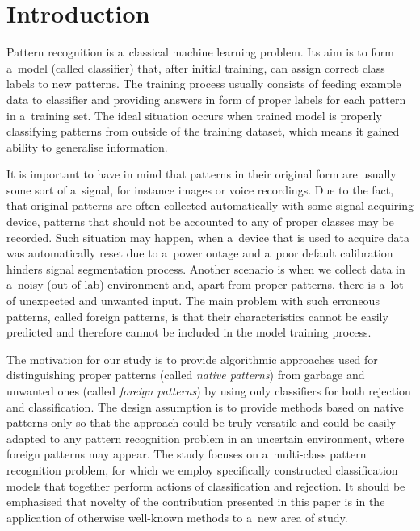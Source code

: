 \documentclass{llncs}
\begin{document}

\section{Introduction}
  \label{sec:Introduction}

Pattern recognition is a~classical machine learning problem. Its aim is to form a~model (called classifier) that, after initial training, can assign correct class labels to new patterns. The training process usually consists of feeding example data to classifier and providing answers in form of proper labels for each pattern in a~training set. The ideal situation occurs when trained model is properly classifying patterns from outside of the training dataset, which means it gained ability to generalise information. 

It is important to have in mind that patterns in their original form are usually some sort of a~signal, for instance images or voice recordings. Due to the fact, that original patterns are often collected automatically with some signal-acquiring device, patterns that should not be accounted to any of proper classes may be recorded. Such situation may happen, when a~device that is used to acquire data was automatically reset due to a~power outage and a~poor default calibration hinders signal segmentation process. Another scenario is when we collect data in a~noisy (out of lab) environment and, apart from proper patterns, there is a~lot of unexpected and unwanted input. The main problem with such erroneous patterns, called foreign patterns, is that their characteristics cannot be easily predicted and therefore cannot be included in the model training process.

The motivation for our study is to provide algorithmic approaches used for distinguishing proper patterns (called \emph{native patterns}) from garbage and unwanted ones (called \emph{foreign patterns}) by using only classifiers for both rejection and classification. The design assumption is to provide methods based on native patterns only so that the approach could be truly versatile and could be easily adapted to any pattern recognition problem in an uncertain environment, where foreign patterns may appear. The study focuses on a~multi-class pattern recognition problem, for which we employ specifically constructed classification models that together perform actions of classification and rejection. It should be emphasised that novelty of the contribution presented in this paper is in the application of otherwise well-known methods to a~new area of study. 
\end{document}

